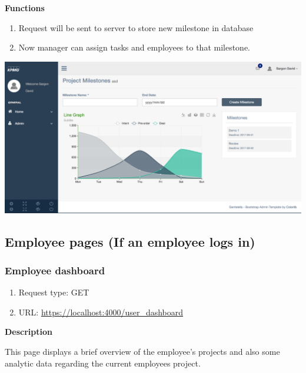 \documentclass[a4paper,12pt]{article}
\begin{document}
				\textbf{Functions}
				\begin{flushright}
				    \begin{enumerate}
				    	\item Request will be sent to server to store new milestone in  database
				    	\item Now manager can assign tasks and employees to that milestone.
				     \end{enumerate}
				\end{flushright}
				\includegraphics[width=0.99\linewidth]{Images/manager_project_milestone.png}
				
	\subsection{Employee pages (If an employee logs in)}
	     \subsubsection{Employee dashboard}
		 		\begin{enumerate}
				 	\item Request type: GET
				 	\item URL: \url{https://localhost:4000/user_dashboard}
				 \end{enumerate}
				
				\textbf{Description}
				\begin{flushright}
				  This page displays a brief overview of the employee's projects and also some analytic data regarding the current employees project.
				\end{flushright}
				
\end{document}
